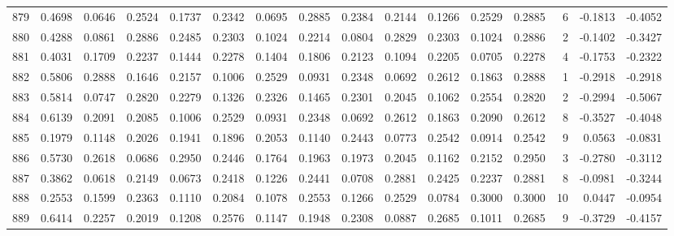 \begin{tabular}{lrrrrrrrrrrrrrrr}
879 &      0.4698 &  0.0646 &  0.2524 &  0.1737 &  0.2342 &  0.0695 &  0.2885 &  0.2384 &  0.2144 &  0.1266 &   0.2529 &     0.2885 &      6 &                   -0.1813 &                    -0.4052 \\
880 &      0.4288 &  0.0861 &  0.2886 &  0.2485 &  0.2303 &  0.1024 &  0.2214 &  0.0804 &  0.2829 &  0.2303 &   0.1024 &     0.2886 &      2 &                   -0.1402 &                    -0.3427 \\
881 &      0.4031 &  0.1709 &  0.2237 &  0.1444 &  0.2278 &  0.1404 &  0.1806 &  0.2123 &  0.1094 &  0.2205 &   0.0705 &     0.2278 &      4 &                   -0.1753 &                    -0.2322 \\
882 &      0.5806 &  0.2888 &  0.1646 &  0.2157 &  0.1006 &  0.2529 &  0.0931 &  0.2348 &  0.0692 &  0.2612 &   0.1863 &     0.2888 &      1 &                   -0.2918 &                    -0.2918 \\
883 &      0.5814 &  0.0747 &  0.2820 &  0.2279 &  0.1326 &  0.2326 &  0.1465 &  0.2301 &  0.2045 &  0.1062 &   0.2554 &     0.2820 &      2 &                   -0.2994 &                    -0.5067 \\
884 &      0.6139 &  0.2091 &  0.2085 &  0.1006 &  0.2529 &  0.0931 &  0.2348 &  0.0692 &  0.2612 &  0.1863 &   0.2090 &     0.2612 &      8 &                   -0.3527 &                    -0.4048 \\
885 &      0.1979 &  0.1148 &  0.2026 &  0.1941 &  0.1896 &  0.2053 &  0.1140 &  0.2443 &  0.0773 &  0.2542 &   0.0914 &     0.2542 &      9 &                    0.0563 &                    -0.0831 \\
886 &      0.5730 &  0.2618 &  0.0686 &  0.2950 &  0.2446 &  0.1764 &  0.1963 &  0.1973 &  0.2045 &  0.1162 &   0.2152 &     0.2950 &      3 &                   -0.2780 &                    -0.3112 \\
887 &      0.3862 &  0.0618 &  0.2149 &  0.0673 &  0.2418 &  0.1226 &  0.2441 &  0.0708 &  0.2881 &  0.2425 &   0.2237 &     0.2881 &      8 &                   -0.0981 &                    -0.3244 \\
888 &      0.2553 &  0.1599 &  0.2363 &  0.1110 &  0.2084 &  0.1078 &  0.2553 &  0.1266 &  0.2529 &  0.0784 &   0.3000 &     0.3000 &     10 &                    0.0447 &                    -0.0954 \\
889 &      0.6414 &  0.2257 &  0.2019 &  0.1208 &  0.2576 &  0.1147 &  0.1948 &  0.2308 &  0.0887 &  0.2685 &   0.1011 &     0.2685 &      9 &                   -0.3729 &                    -0.4157 \\

\end{tabular}
